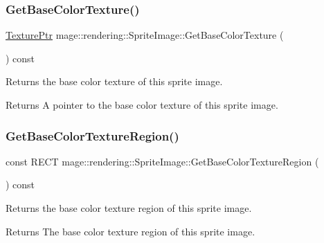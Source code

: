 \subsubsection{\texorpdfstring{Get\+Base\+Color\+Texture()}{GetBaseColorTexture()}}
{\footnotesize\ttfamily \mbox{\hyperlink{namespacemage_1_1rendering_a6f3ae54f825328465b0cdde0f0de4a36}{Texture\+Ptr}} mage\+::rendering\+::\+Sprite\+Image\+::\+Get\+Base\+Color\+Texture (\begin{DoxyParamCaption}{ }\end{DoxyParamCaption}) const\hspace{0.3cm}{\ttfamily [noexcept]}}

Returns the base color texture of this sprite image.

\begin{DoxyReturn}{Returns}
A pointer to the base color texture of this sprite image. 
\end{DoxyReturn}
\mbox{\label{classmage_1_1rendering_1_1_sprite_image_ae8d120b87e4791cf85799623ae554f41}} 
\subsubsection{\texorpdfstring{Get\+Base\+Color\+Texture\+Region()}{GetBaseColorTextureRegion()}}
{\footnotesize\ttfamily const R\+E\+CT mage\+::rendering\+::\+Sprite\+Image\+::\+Get\+Base\+Color\+Texture\+Region (\begin{DoxyParamCaption}{ }\end{DoxyParamCaption}) const\hspace{0.3cm}{\ttfamily [noexcept]}}

Returns the base color texture region of this sprite image.

\begin{DoxyReturn}{Returns}
The base color texture region of this sprite image. 
\end{DoxyReturn}
\mbox{\label{classmage_1_1rendering_1_1_sprite_image_a82a804fe9ed8c685268a1a42ab853eb4}} 
